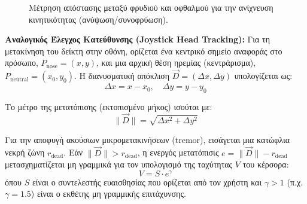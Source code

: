 \documentclass[twoside, a4paper, 11pt]{article}
\newcommand{\textlatin}[1]{\textenglish{#1}}
\begin{document}
\begin{figure}[!htbp]
\centering
{}
\caption{Μέτρηση απόστασης μεταξύ φρυδιού και οφθαλμού για την ανίχνευση κινητικότητας (ανύψωση/συνοφρύωση).}
\label{fig:eyebrow_geometry}
\end{figure}
\clearpage
\bigskip
\noindent\textbf{Αναλογικός Έλεγχος Κατεύθυνσης (\textlatin{Joystick Head Tracking}):} Για τη μετακίνηση του δείκτη στην οθόνη, ορίζεται ένα κεντρικό σημείο αναφοράς στο πρόσωπο, $P_{\text{nose}} = (x, y)$, και μια αρχική θέση ηρεμίας (κεντράρισμα), $P_{\text{neutral}} = (x_0, y_0)$. Η διανυσματική απόκλιση $\vec{D} = (\Delta x, \Delta y)$ υπολογίζεται ως:
\begin{equation}
\Delta x = x - x_0, \quad \Delta y = y - y_0
\end{equation}

Το μέτρο της μετατόπισης (εκτοπισμένο μήκος) ισούται με:
\begin{equation}
\|\vec{D}\| = \sqrt{\Delta x^2 + \Delta y^2}
\end{equation}

Για την αποφυγή ακούσιων μικρομετακινήσεων (\textlatin{tremor}), εισάγεται μια κατώφλια νεκρή ζώνη $r_{\text{dead}}$. Εάν $\|\vec{D}\| > r_{\text{dead}}$, η ενεργός μετατόπισις $e = \|\vec{D}\| - r_{\text{dead}}$ μετασχηματίζεται μη γραμμικά για τον υπολογισμό της ταχύτητας $V$ του κέρσορα:
\begin{equation}
V = S \cdot e^{\gamma}
\end{equation}
όπου $S$ είναι ο συντελεστής ευαισθησίας που ορίζεται από τον χρήστη και $\gamma > 1$ (π.χ. $\gamma = 1.5$) είναι ο εκθέτης μη γραμμικής επιτάχυνσης.
\end{document}
